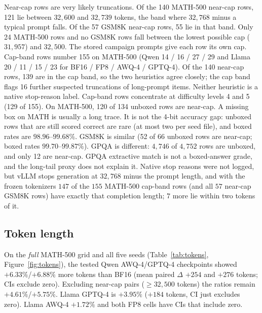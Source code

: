 \documentclass[11pt,a4paper]{article}
\begin{document}
Near-cap rows are very likely truncations. Of the 140 MATH-500 near-cap rows, 121 lie between $32{,}600$ and $32{,}739$ tokens, the band where $32{,}768$ minus a typical prompt falls. Of the 57 GSM8K near-cap rows, 55 lie in that band. Only 24 MATH-500 rows and no GSM8K rows fall between the lowest possible cap ($31{,}957$) and $32{,}500$. The stored campaign prompts give each row its own cap. Cap-band rows number 155 on MATH-500 (Qwen 14 / 16 / 27 / 29 and Llama 20 / 11 / 15 / 23 for BF16 / FP8 / AWQ-4 / GPTQ-4). Of the 140 near-cap rows, 139 are in the cap band, so the two heuristics agree closely; the cap band flags 16 further suspected truncations of long-prompt items. Neither heuristic is a native stop-reason label. Cap-band rows concentrate at difficulty levels 4 and 5 (129 of 155). On MATH-500, 120 of 134 unboxed rows are near-cap. A missing box on MATH is usually a long trace. It is not the 4-bit accuracy gap: unboxed rows that are still scored correct are rare (at most two per seed file), and boxed rates are $98.96$--$99.68\%$. GSM8K is similar (52 of 66 unboxed rows are near-cap; boxed rates $99.70$--$99.87\%$). GPQA is different: $4{,}746$ of $4{,}752$ rows are unboxed, and only 12 are near-cap. GPQA extractive match is not a boxed-answer grade, and the long-tail proxy does not explain it. Native stop reasons were not logged, but vLLM stops generation at $32{,}768$ minus the prompt length, and with the frozen tokenizers $147$ of the $155$ MATH-500 cap-band rows (and all $57$ near-cap GSM8K rows) have exactly that completion length; $7$ more lie within two tokens of it.

\subsection{Token length}
\label{sec:economics}
On the \emph{full} MATH-500 grid and all five seeds (Table~\ref{tab:tokens}, Figure~\ref{fig:tokens}), the tested Qwen AWQ-4/GPTQ-4 checkpoints showed $+6.33\%$/$+6.88\%$ more tokens than BF16 (mean paired $\Delta$ $+254$ and $+276$ tokens; CIs exclude zero). Excluding near-cap pairs ($\ge 32{,}500$ tokens) the ratios remain $+4.61\%$/$+5.75\%$. Llama GPTQ-4 is $+3.95\%$ ($+184$ tokens, CI just excludes zero). Llama AWQ-4 $+1.72\%$ and both FP8 cells have CIs that include zero.
\end{document}
